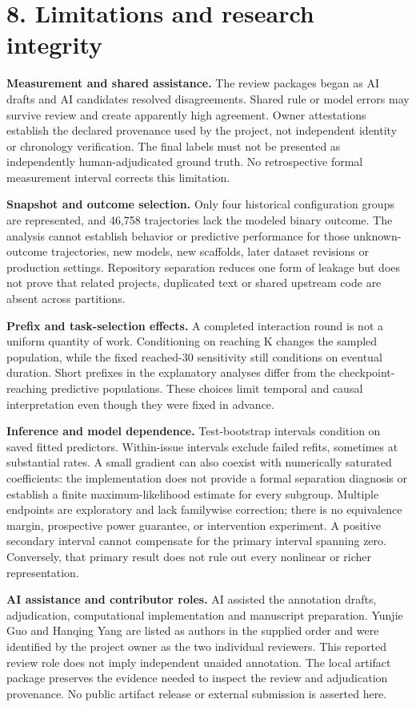 \documentclass[10pt,a4paper]{article}
\begin{document}
\section{8. Limitations and research integrity}
\textbf{Measurement and shared assistance.} The review packages began as AI drafts and AI candidates resolved disagreements. Shared rule or model errors may survive review and create apparently high agreement. Owner attestations establish the declared provenance used by the project, not independent identity or chronology verification. The final labels must not be presented as independently human-adjudicated ground truth. No retrospective formal measurement interval corrects this limitation.

\textbf{Snapshot and outcome selection.} Only four historical configuration groups are represented, and 46,758 trajectories lack the modeled binary outcome. The analysis cannot establish behavior or predictive performance for those unknown-outcome trajectories, new models, new scaffolds, later dataset revisions or production settings. Repository separation reduces one form of leakage but does not prove that related projects, duplicated text or shared upstream code are absent across partitions.

\textbf{Prefix and task-selection effects.} A completed interaction round is not a uniform quantity of work. Conditioning on reaching K changes the sampled population, while the fixed reached-30 sensitivity still conditions on eventual duration. Short prefixes in the explanatory analyses differ from the checkpoint-reaching predictive populations. These choices limit temporal and causal interpretation even though they were fixed in advance.

\textbf{Inference and model dependence.} Test-bootstrap intervals condition on saved fitted predictors. Within-issue intervals exclude failed refits, sometimes at substantial rates. A small gradient can also coexist with numerically saturated coefficients: the implementation does not provide a formal separation diagnosis or establish a finite maximum-likelihood estimate for every subgroup. Multiple endpoints are exploratory and lack familywise correction; there is no equivalence margin, prospective power guarantee, or intervention experiment. A positive secondary interval cannot compensate for the primary interval spanning zero. Conversely, that primary result does not rule out every nonlinear or richer representation.

\textbf{AI assistance and contributor roles.} AI assisted the annotation drafts, adjudication, computational implementation and manuscript preparation. Yunjie Guo and Hanqing Yang are listed as authors in the supplied order and were identified by the project owner as the two individual reviewers. This reported review role does not imply independent unaided annotation. The local artifact package preserves the evidence needed to inspect the review and adjudication provenance. No public artifact release or external submission is asserted here.
\end{document}

